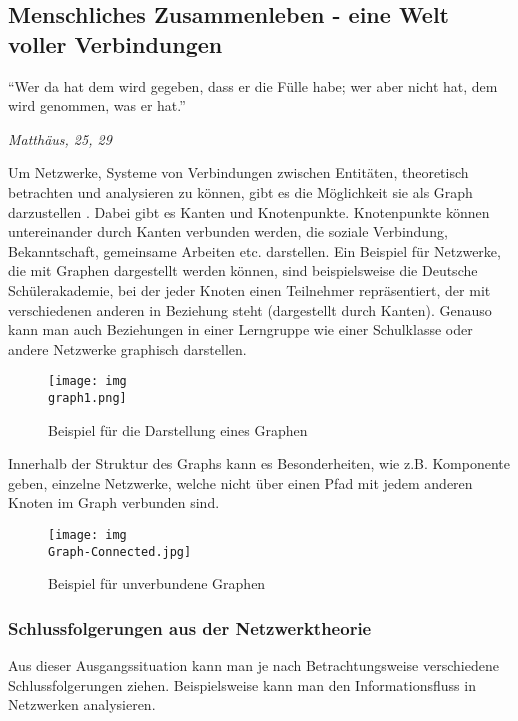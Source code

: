 \subsection{Menschliches Zusammenleben - eine Welt voller Verbindungen}

\epigraph{
		``Wer da hat dem wird gegeben, dass er die Fülle habe; wer aber nicht hat, dem wird genommen, was er hat.''}
	{
		\emph{Matthäus, 25, 29
	}

Um Netzwerke, Systeme von Verbindungen zwischen Entitäten, theoretisch betrachten und analysieren zu können, gibt es die Möglichkeit sie als Graph darzustellen \parencite[vgl.]{Kleinberg-2009-oz}.
Dabei gibt es Kanten und Knotenpunkte.
Knotenpunkte können untereinander durch Kanten verbunden werden, die soziale Verbindung, Bekanntschaft, gemeinsame Arbeiten etc. darstellen.
Ein Beispiel für Netzwerke, die mit Graphen dargestellt werden können, sind beispielsweise die Deutsche Schülerakademie, bei der jeder Knoten einen Teilnehmer repräsentiert, der mit verschiedenen anderen in Beziehung steht (dargestellt durch Kanten).
Genauso kann man auch Beziehungen in einer Lerngruppe wie einer Schulklasse oder andere Netzwerke graphisch darstellen.

\begin{figure}[htbp]
	\begin{center}
	\texttt{[image: img\\graph1.png]}
	\caption{Beispiel für die Darstellung eines Graphen \cite{Kleinberg-2009-oz}}
	\label{fig:graph1}
	\end{center}
\end{figure}

Innerhalb der Struktur des Graphs kann es Besonderheiten, wie z.B. Komponente geben, einzelne Netzwerke, welche nicht über einen Pfad mit jedem anderen Knoten im Graph verbunden sind.

\begin{figure}[htbp]
	\begin{center}
	\texttt{[image: img\\Graph-Connected.jpg]}
	\caption{Beispiel für unverbundene Graphen \cite{Kleinberg-2009-oz}}
	\label{fig:graph1}
	\end{center}
\end{figure}


\subsubsection{Schlussfolgerungen aus der Netzwerktheorie}

Aus dieser Ausgangssituation kann man je nach Betrachtungsweise verschiedene Schlussfolgerungen ziehen.
Beispielsweise kann man den Informationsfluss in Netzwerken analysieren.

}
